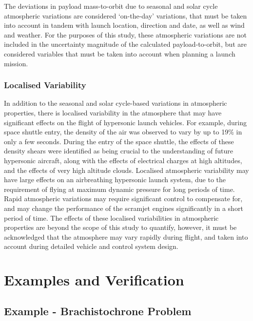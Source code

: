 The deviations in payload mass-to-orbit due to seasonal and solar cycle atmospheric variations are considered `on-the-day' variations, that must be taken into account in tandem with launch location, direction and date, as well as wind and weather. For the purposes of this study, these atmospheric variations are not included in the uncertainty magnitude of the calculated payload-to-orbit, but are considered variables that must be taken into account when planning a launch mission. 

\subsection{Localised Variability}

In addition to the seasonal and solar cycle-based variations in atmospheric properties, there is localised variability in the atmosphere that may have significant effects on the flight of hypersonic launch vehicles. For example, during space shuttle entry, the density of the air was observed to vary by up to 19\% in only a few seconds\cite{Hale2002}. During the entry of the space shuttle, the effects of these density shears were identified as being crucial to the understanding of future hypersonic aircraft, along with the effects of electrical charges at high altitudes, and the effects of very high altitude clouds. Localised atmospheric variability may have large effects on an airbreathing hypersonic launch system, due to the requirement of flying at maximum dynamic pressure for long periods of time. Rapid atmospheric variations may require significant control to compensate for, and may change the performance of the scramjet engines significantly in a short period of time. The effects of these localised variabilities in atmospheric properties are beyond the scope of this study to quantify, however, it must be acknowledged that the atmosphere may vary rapidly during flight, and taken into account during detailed vehicle and control system design. 
	




	


\chapter{Examples and Verification}

\section{Example - Brachistochrone Problem}

